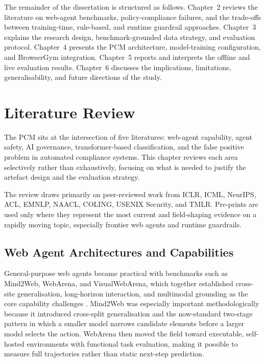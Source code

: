 \documentclass[12pt,a4paper]{article}
\begin{document}
The remainder of the dissertation is structured as follows. Chapter~2 reviews
the literature on web-agent benchmarks, policy-compliance failures, and the
trade-offs between training-time, rule-based, and runtime guardrail approaches.
Chapter~3 explains the research design, benchmark-grounded data strategy, and
evaluation protocol. Chapter~4 presents the PCM architecture, model-training
configuration, and BrowserGym integration. Chapter~5 reports and interprets the
offline and live evaluation results. Chapter~6 discusses the implications,
limitations, generalisability, and future directions of the study.
\newpage
\setcounter{section}{1}
\section{Literature Review}
\label{ch:litreview}

The PCM sits at the intersection of five literatures: web-agent capability,
agent safety, AI governance, transformer-based classification, and the false
positive problem in automated compliance systems. This chapter reviews each area
selectively rather than exhaustively, focusing on what is needed to justify the
artefact design and the evaluation strategy.

The review draws primarily on peer-reviewed work from ICLR, ICML, NeurIPS, ACL,
EMNLP, NAACL, COLING, USENIX Security, and TMLR. Pre-prints are used only where
they represent the most current and field-shaping evidence on a rapidly moving
topic, especially frontier web agents and runtime guardrails.

\subsection{Web Agent Architectures and Capabilities}

General-purpose web agents became practical with benchmarks such as Mind2Web,
WebArena, and VisualWebArena, which together established cross-site
generalisation, long-horizon interaction, and multimodal grounding as the core
capability challenges \citep{deng2023mind2web,zhou2024webarena,koh2024visualwebarena}.
Mind2Web was especially important methodologically because it introduced
cross-split generalisation and the now-standard two-stage pattern in which a
smaller model narrows candidate elements before a larger model selects the
action. WebArena then moved the field toward executable, self-hosted
environments with functional task evaluation, making it possible to measure
full trajectories rather than static next-step prediction.
\end{document}
